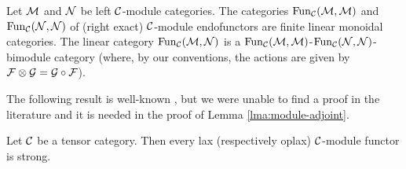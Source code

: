 \documentclass{amsart}
\begin{document}
\begin{example}
	Let $\mathcal M$ and $\mathcal N$ be left $\mathcal C$-module categories. The categories $\operatorname{Fun}_{\mathcal C}(\mathcal M, \mathcal M)$ and $\operatorname{Fun}_{\mathcal C}(\mathcal N, \mathcal N)$ of (right exact) $\mathcal C$-module endofunctors are finite linear monoidal categories. The linear category $\operatorname{Fun}_{\mathcal C}(\mathcal M, \mathcal N)$ is a $\operatorname{Fun}_{\mathcal C}(\mathcal M, \mathcal M)$-$\operatorname{Fun}_{\mathcal C}(\mathcal N, \mathcal N)$-bimodule category (where, by our conventions, the actions are given by $\mathcal F \otimes \mathcal G = \mathcal G \circ \mathcal F$). 
\end{example}


The following result is well-known \cite[Rmk 4]{MR1976459}, but we were unable to find a proof in the literature and it is needed in the proof of Lemma  \ref{lma:module-adjoint}.

\begin{lemma} \label{lem:laxisstrong}
	Let $\mathcal C$ be a tensor category. Then every lax (respectively oplax) $\mathcal C$-module functor is strong.  
\end{lemma} 
\end{document}
